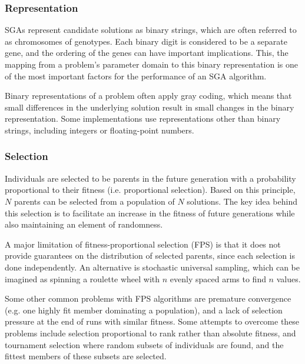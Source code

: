 \documentclass[12pt,titlepage]{article}
\begin{document}
      \subsubsection{Representation}
        SGAs represent candidate solutions as binary strings, which are often referred to as chromosomes of genotypes. Each binary digit is considered to be a separate gene, and
        the ordering of the genes can have important implications. This, the mapping from a problem's parameter domain to this binary representation is one of the most important
        factors for the performance of an SGA algorithm.

        Binary representations of a problem often apply gray coding, which means that small differences in the underlying solution result in small changes in the binary
        representation. Some implementations use representations other than binary strings, including integers or floating-point numbers.

      \subsubsection{Selection}
        Individuals are selected to be parents in the future generation with a probability proportional to their fitness (i.e. proportional selection). Based on this principle,
        $N$ parents can be selected from a population of $N$ solutions. The key idea behind this selection is to facilitate an increase in the fitness of future generations while
        also maintaining an element of randomness.

        A major limitation of fitness-proportional selection (FPS) is that it does not provide guarantees on the distribution of selected parents, since each selection is done
        independently. An alternative is stochastic universal sampling, which can be imagined as spinning a roulette wheel with $n$ evenly spaced arms to find $n$ values.

        Some other common problems with FPS algorithms are premature convergence (e.g. one highly fit member dominating a population), and a lack of selection pressure at the end
        of runs with similar fitness. Some attempts to overcome these problems include selection proportional to rank rather than absolute fitness, and tournament selection where
        random subsets of individuals are found, and the fittest members of these subsets are selected.
\end{document}
